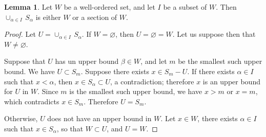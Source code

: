 \documentclass[11pt,a4paper,twoside]{article}
\theoremstyle{definition}
\newtheorem{lemma}{Lemma}
\begin{document}
\bigskip
\begin{lemma}\label{lemma:union_of_sections}
  Let $W$ be a well-ordered set, and let $I$ be a subset of $W$. Then $\cup_{\alpha \in I} \,S_\alpha$ is
  either $W$ or a section of $W$.
\end{lemma}

\begin{proof}
  Let $U = \cup_{\alpha \in I} \,S_\alpha$.
  If $W = \varnothing$, then $U = \varnothing = W$. Let us suppose then that $W \neq \varnothing$.

  Suppose that $U$ has un upper bound $\beta \in W$, and let $m$ be the smallest such upper bound.
  We have $U \subset S_m$. Suppose there exists $x \in S_m - U$. If there exists $\alpha \in I$
  such that $x < \alpha$, then $x \in S_\alpha \subset U$, a contradiction; therefore $x$ is an upper bound
  for $U$ in $W$. Since $m$ is the smallest such upper bound, we have $x > m$ or $x = m$,
  which contradicts $x \in S_m$. Therefore $U = S_m$.

  Otherwise, $U$ does not have an upper bound in $W$. Let $x \in W$, there exists $\alpha \in I$ such
  that $x \in S_\alpha$, so that $W \subset U$, and $U = W$.
\end{proof}
\end{document}
